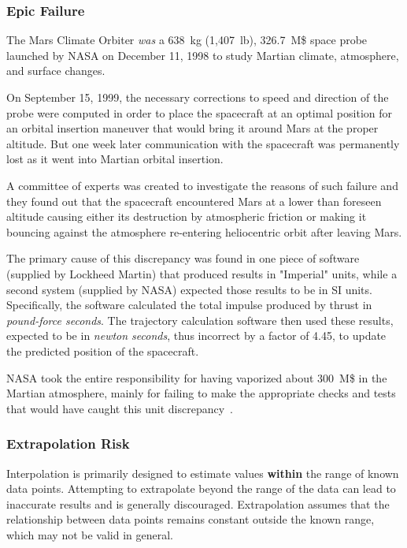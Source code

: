 \begin{curiosity}
\subsubsection{Epic Failure}
The Mars Climate Orbiter \emph{was} a 638~kg (1,407~lb), 326.7~M\$ space probe launched by NASA on December 11, 1998 to study Martian climate, atmosphere, and surface changes. 

On September 15, 1999, the necessary corrections to speed and direction of the probe were computed in order to place the spacecraft at an optimal position for an orbital insertion maneuver that would bring it around Mars at the proper altitude. 
But one week later communication with the spacecraft was permanently lost as it went into Martian orbital insertion. 

A committee of experts was created to investigate the reasons of 
such failure and they found out that the spacecraft encountered Mars at a lower than foreseen altitude causing either its destruction by atmospheric friction or making it bouncing against the atmosphere re-entering heliocentric orbit after leaving Mars.

The primary cause of this discrepancy was found in one piece of software (supplied by Lockheed Martin) that produced results in "Imperial" units,  while a second system (supplied by NASA) expected those results to be in SI units. Specifically, the software calculated the total impulse produced by thrust in \emph{pound-force seconds}. The trajectory calculation software then used these results, expected to be in \emph{newton seconds}, thus incorrect by a factor of 4.45, to update the predicted position of the spacecraft.
	
NASA took the entire responsibility for having vaporized about 300~M\$ in the Martian atmosphere, mainly for failing to make the appropriate checks and tests that would have caught this unit discrepancy~\cite{bib:mars}.	
\end{curiosity}

\subsubsection{Extrapolation Risk}

Interpolation is primarily designed to estimate values \textbf{within} the range of known data points. Attempting to extrapolate beyond the range of the data can lead to inaccurate results and is generally discouraged. Extrapolation assumes that the relationship between data points remains constant outside the known range, which may not be valid in general.

